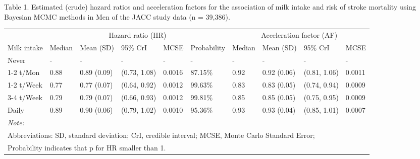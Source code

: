 \documentclass[]{tufte-handout}
\begin{document}
\begin{table}[!htbp]
Table 1. Estimated (crude) hazard ratios and acceleration factors for the association of milk intake and risk of stroke mortality using Bayesian MCMC methods in Men of the JACC study data (n = 39,386).

\centering
\fontsize{8}{10}\selectfont
\begin{tabular}[t]{llllllllll}
\toprule
\multicolumn{1}{c}{ } & \multicolumn{5}{c}{Hazard ratio (HR)} & \multicolumn{4}{c}{Acceleration factor (AF)} \\
\cmidrule(l{3pt}r{3pt}){2-6} \cmidrule(l{3pt}r{3pt}){7-10}
Milk intake & Median & Mean (SD) & 95\% CrI & MCSE & Probability & Median & Mean (SD) & 95\% CrI & MCSE\\
\midrule
\rowcolor{gray!6}  Never & - & - & - & - & - & - & - & - & -\\
1-2 t/Mon & 0.88 & 0.89 (0.09) & (0.73, 1.08) & 0.0016 & 87.15\% & 0.92 & 0.92 (0.06) & (0.81, 1.06) & 0.0011\\
\rowcolor{gray!6}  1-2 t/Week & 0.77 & 0.77 (0.07) & (0.64, 0.92) & 0.0012 & 99.63\% & 0.83 & 0.83 (0.05) & (0.74, 0.94) & 0.0009\\
3-4 t/Week & 0.79 & 0.79 (0.07) & (0.66, 0.93) & 0.0012 & 99.81\% & 0.85 & 0.85 (0.05) & (0.75, 0.95) & 0.0009\\
\rowcolor{gray!6}  Daily & 0.89 & 0.90 (0.06) & (0.79, 1.02) & 0.0010 & 95.36\% & 0.93 & 0.93 (0.04) & (0.85, 1.01) & 0.0007\\
\bottomrule
\multicolumn{10}{l}{\textit{Note: }}\\
\multicolumn{10}{l}{Abbreviations: SD, standard deviation; CrI, credible interval; MCSE, Monte Carlo Standard Error;}\\
\multicolumn{10}{l}{ Probability indicates that p for HR smaller than 1.}\\
\end{tabular}
\end{table}
\end{document}
